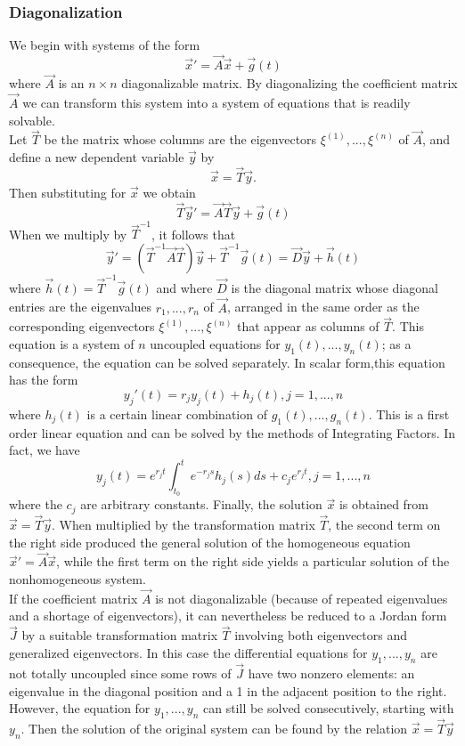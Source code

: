 \documentclass[10pt]{report}
\begin{document}
\subsubsection{Diagonalization}
We begin with systems of the form
$$\vec{x}'=\vec{A}\vec{x} + \vec{g}(t)$$
where $\vec{A}$ is an $n\times n$ diagonalizable matrix. By diagonalizing the coefficient matrix $\vec{A}$ we can transform this system into a system of equations that is readily solvable.\\
Let $\vec{T}$ be the matrix whose columns are the eigenvectors $\xi^{(1)},...,\xi^{(n)}$ of $\vec{A}$, and define a new dependent variable $\vec{y}$ by
$$\vec{x} = \vec{T}\vec{y}.$$
Then substituting for $\vec{x}$ we obtain
$$\vec{T}\vec{y}'=\vec{A}\vec{T}\vec{y}+\vec{g}(t)$$
When we multiply by $\vec{T}^{-1}$, it follows that
$$\vec{y}' = (\vec{T}^{-1}\vec{A}\vec{T})\vec{y} + \vec{T}^{-1}\vec{g}(t) = \vec{D}\vec{y} + \vec{h}(t)$$
where $\vec{h}(t) = \vec{T}^{-1}\vec{g}(t)$ and where $\vec{D}$ is the diagonal matrix whose diagonal entries are the eigenvalues $r_1,...,r_n$ of $\vec{A}$, arranged in the same order as the corresponding eigenvectors $\xi^{(1)},...,\xi^{(n)}$ that appear as columns of $\vec{T}$. This equation is a system of $n$ uncoupled equations for $y_1(t),...,y_n(t)$; as a consequence, the equation can be solved separately. In scalar form,this equation has the form
$$y_j'(t)=r_jy_j(t)+h_j(t), j=1,...,n$$
where $h_j(t)$ is a certain linear combination of $g_1(t),...,g_n(t)$. This is a first order linear equation and can be solved by the methods of Integrating Factors. In fact, we have
$$y_j(t) = e^{r_jt}\int_{t_0}^t e^{-r_js}h_j(s)ds + c_je^{r_jt}, j=1,...,n$$
where the $c_j$ are arbitrary constants. Finally, the solution $\vec{x}$ is obtained from $\vec{x} = \vec{T}\vec{y}$. When multiplied by the transformation matrix $\vec{T}$, the second term on the right side produced the general solution of the homogeneous equation $\vec{x}' = \vec{A}\vec{x}$, while the first term on the right side yields a particular solution of the nonhomogeneous system.\\
If the coefficient matrix $\vec{A}$ is not diagonalizable (because of repeated eigenvalues and a shortage of eigenvectors), it can nevertheless be reduced to a Jordan form $\vec{J}$ by a suitable transformation matrix $\vec{T}$ involving both eigenvectors and generalized eigenvectors. In this case the differential equations for $y_1,...,y_n$ are not totally uncoupled since some rows of $\vec{J}$ have two nonzero elements: an eigenvalue in the diagonal position and a 1 in the adjacent position to the right. However, the equation for $y_1,...,y_n$ can still be solved consecutively, starting with $y_n$. Then the solution of the original system can be found by the relation $\vec{x} = \vec{T}\vec{y}$
\end{document}
